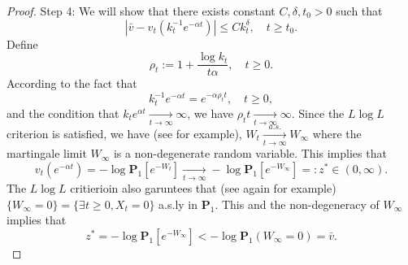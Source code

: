\documentclass[12pt,a4paper]{amsart}
\theoremstyle{plain}
\theoremstyle{definition}
\numberwithin{equation}{section}
\begin{document}
\begin{proof}
    Step 4: We will show that there exists constant $C, \delta,t_0>0$ such that
\[
    |\bar v - v_t(k_t^{-1} e^{-\alpha t})|\leq Ck_t^\delta, \quad t\geq t_0.
\]
    Define 
\[
    \rho_t := 1+ \frac{\log k_t}{t\alpha}, \quad t\geq 0.
\]
    According to the fact that
\[
    k_t^{-1}e^{-\alpha t} = e^{-\alpha \rho_t t}, \quad t\geq 0,
\]
    and the condition that $k_t e^{\alpha t} \xrightarrow[t\to \infty]{} \infty$, we have $\rho_t t \xrightarrow[t\to \infty]{} \infty $.
    Since the $L\log L$ criterion is satisfied, we have (see \cite{LiuRenSong2009Llog} for example), $W_t \xrightarrow[t\to \infty]{a.s.} W_\infty$ where the martingale limit $W_\infty$ is a non-degenerate random variable. This implies that 
\[
    v_t(e^{-\alpha t}) = -\log \mathbf P_1[e^{-W_t}]\xrightarrow[t\to \infty]{} - \log \mathbf P_{1}[e^{-W_\infty}] =: z^* \in (0,\infty).
\]
    The $L \log L$ critierioin also garuntees that (see again \cite{LiuRenSong2009Llog} for example) $\{W_\infty = 0\} = \{\exists t \geq 0, X_t= 0\}$  a.s.ly in $\mathbf P_1$. This and the non-degeneracy of $W_\infty$ implies that
\[
    z^*=-\log \mathbf P_1[e^{-W_\infty}] < -\log \mathbf P_1(W_\infty = 0) = \bar v.
\]
    

\end{proof}
\end{document}
